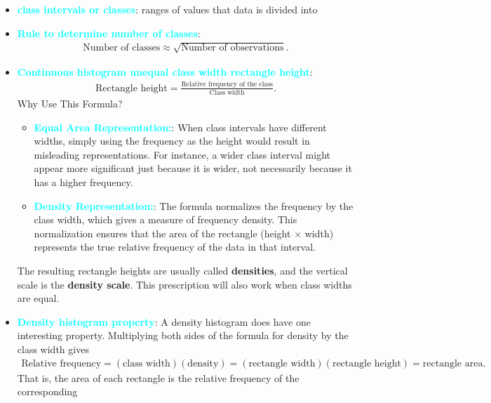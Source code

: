 \documentclass{report}
\begin{document}
\begin{itemize}
        \item \textbf{\textcolor{cyan}{class intervals or classes}}: ranges of values that data is divided into
        \item \textbf{\textcolor{cyan}{Rule to determine number of classes}}: 
            \begin{align*}
                \text{Number of classes} \approx \sqrt{\text{Number of observations}}
            .\end{align*}
        \item \textbf{\textcolor{cyan}{Continuous histogram unequal class width rectangle height}}:
            \begin{align*}
                \text{Rectangle height} = \frac{\text{Relative frequency of the class}}{\text{Class width}}
            .\end{align*}
            Why Use This Formula?
            \begin{itemize}
                \item \textbf{\textcolor{cyan}{Equal Area Representation:}}: When class intervals have different widths, simply using the frequency as the height would result in misleading representations. For instance, a wider class interval might appear more significant just because it is wider, not necessarily because it has a higher frequency.
                \item \textbf{\textcolor{cyan}{Density Representation:}}: The formula normalizes the frequency by the class width, which gives a measure of frequency density. This normalization ensures that the area of the rectangle (height $\times$ width) represents the true relative frequency of the data in that interval.
            \end{itemize}
            The resulting rectangle heights are usually called \textbf{densities}, and the vertical
            scale is the \textbf{density scale}. This prescription will also work when class widths are equal.
        \item \textbf{\textcolor{cyan}{Density histogram property}}: A density histogram does have one interesting property. Multiplying both sides of the formula for density by the class width gives
            \begin{align*}
                \text{Relative frequency} = (\text{class width})(\text{density}) = (\text{rectangle width})(\text{rectangle height}) = \text{rectangle area}
            .\end{align*}
            That is, the area of each rectangle is the relative frequency of the corresponding

\end{itemize}
\end{document}
